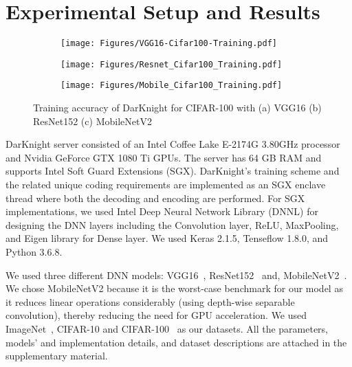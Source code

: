 \section{Experimental Setup and Results}
\label{sec:experiments}
\begin{figure*}[tbp]
  \centering
  \begin{subfigure}[b]{0.3\linewidth}
    \texttt{[image: Figures/VGG16-Cifar100-Training.pdf]}
  \end{subfigure}
  \begin{subfigure}[b]{0.3\linewidth}
    \texttt{[image: Figures/Resnet\_Cifar100\_Training.pdf]}
  \end{subfigure}
    \begin{subfigure}[b]{0.3\linewidth}
    \texttt{[image: Figures/Mobile\_Cifar100\_Training.pdf]}
  \end{subfigure}
  \caption{Training accuracy of DarKnight for CIFAR-100 with (a) VGG16 (b) ResNet152 (c) MobileNetV2}
  \label{fig:training}
\end{figure*}
DarKnight server consisted of an Intel Coffee Lake E-2174G 3.80GHz processor and Nvidia GeForce GTX 1080 Ti GPUs.
The server has 64 GB RAM and supports Intel Soft Guard Extensions (SGX).
DarKnight's training scheme and the related unique coding requirements are implemented as an SGX enclave thread where both the decoding and encoding are performed. For SGX implementations, we used Intel Deep Neural Network Library (DNNL) for designing the DNN layers including the Convolution layer, ReLU, MaxPooling, and Eigen library for Dense layer. We used Keras 2.1.5, Tenseflow 1.8.0, and Python 3.6.8. %


We used three different DNN models: VGG16~\citep{simonyan2014very}, ResNet152~\citep{he2016deep} and, MobileNetV2~\citep{sandler2018mobilenetv2}. We chose MobileNetV2 because it is the worst-case benchmark for our model as it reduces linear operations considerably (using depth-wise separable convolution), thereby reducing the need for GPU acceleration. %
We used ImageNet~\citep{russakovsky2015imagenet}, CIFAR-10 and CIFAR-100~\citep{krizhevsky2009learning} as our datasets. 
All the parameters, models' and implementation details, and dataset descriptions are attached in the supplementary material. 



